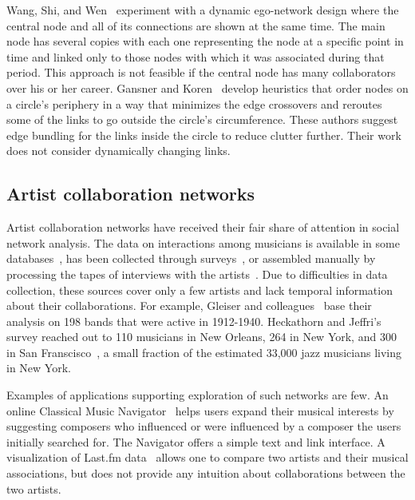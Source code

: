 \documentclass[12pt]{cmuthesis}
\begin{document}
  Wang, Shi, and Wen~\cite{Wang2011a} experiment with a dynamic ego-network design where the central node and all of its connections are shown at the same time. The main node has several copies with each one representing the node at a specific point in time and linked only to those nodes with which it was associated during that period. This approach is not feasible if the central node has many collaborators over his or her career. Gansner and Koren~\cite{Gansner2006} develop heuristics that order nodes on a circle's periphery in a way that minimizes the edge crossovers and reroutes some of the links to go outside the circle's circumference. These authors suggest edge bundling for the links inside the circle to reduce clutter further. Their work does not consider dynamically changing links.

  \subsection{Artist collaboration networks}

  Artist collaboration networks have received their fair share of attention in social network analysis. The data on interactions among musicians is available in some databases~\cite{Gleiser2003,Pattuelli2012}, has been collected through surveys~\cite{Heckathorn2001a}, or assembled manually by processing the tapes of interviews with the artists~\cite{Pattuelli2011}. Due to difficulties in data collection, these sources cover only a few artists and lack temporal information about their collaborations. For example, Gleiser and colleagues~\cite{Gleiser2003} base their analysis on 198 bands that were active in 1912-1940. Heckathorn and Jeffri's survey reached out to 110 musicians in New Orleans, 264 in New York, and 300 in San Franscisco~\cite{Heckathorn2001a}, a small fraction of the estimated 33,000 jazz musicians living in New York.

  Examples of applications supporting exploration of such networks are few. An online Classical Music Navigator~\cite{Smith1999} helps users expand their musical interests by suggesting composers who influenced or were influenced by a composer the users initially searched for. The Navigator offers a simple text and link interface. A visualization of Last.fm data~\cite{Bieh-Zimmert2011} allows one to compare two artists and their musical associations, but does not provide any intuition about collaborations between the two artists.
\end{document}
